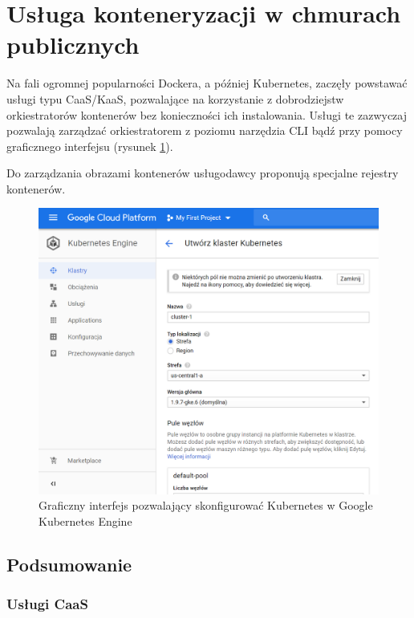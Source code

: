 \documentclass[12pt,a4paper,twoside,titlepage,openright]{book}
\begin{document}
\section{Usługa konteneryzacji w chmurach publicznych}\label{section:caas}

Na fali ogromnej popularności Dockera, a później Kubernetes, zaczęły powstawać usługi typu CaaS/KaaS, pozwalające na korzystanie z dobrodziejstw orkiestratorów kontenerów bez konieczności ich instalowania. Usługi te zazwyczaj pozwalają zarządzać orkiestratorem z poziomu narzędzia CLI bądź przy pomocy graficznego interfejsu (rysunek \ref{fig:kubernetes-engine}).

Do zarządzania obrazami kontenerów usługodawcy proponują specjalne rejestry kontenerów.

\begin{figure}[h]
	\centering
			\includegraphics[width=\textwidth]{kubernetes-service.png}
		\caption{Graficzny interfejs pozwalający skonfigurować Kubernetes w Google Kubernetes Engine}
		\label{fig:kubernetes-engine}
\end{figure}

\subsection*{Podsumowanie}

\subsubsection{Usługi CaaS}
\end{document}

